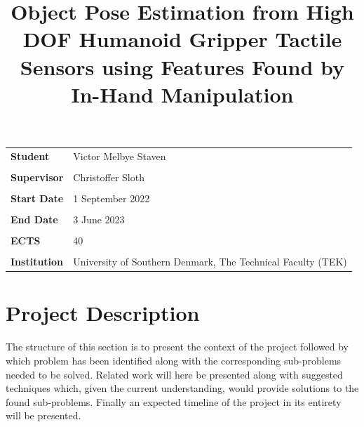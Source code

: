 \documentclass{article}
\title{Object Pose Estimation from High DOF Humanoid Gripper Tactile Sensors using Features Found by In-Hand Manipulation}
\author{\vspace{-1cm}}
\date{\vspace{-1cm}}
\begin{document}
\maketitle

\begin{flushleft}
\begin{tabular}{@{} p{} p{} @{}} 
 \textbf{Student}     & Victor Melbye Staven \\ \\
 \textbf{Supervisor}  & Christoffer Sloth \\ \\
 \textbf{Start Date}  & 1 September 2022 \\ \\
 \textbf{End Date}    & 3 June 2023 \\ \\
 \textbf{ECTS}        & 40 \\ \\
 \textbf{Institution} & University of Southern Denmark, The Technical Faculty (TEK)
\end{tabular}
\end{flushleft}

\newpage

\section*{Project Description}
\label{project-description}
The structure of this section is to present the context of the project followed by which problem has been identified along with the corresponding sub-problems needed to be solved. Related work will here be presented along with suggested techniques which, given the current understanding, would provide solutions to the found sub-problems. Finally an expected timeline of the project in its entirety will be presented. 
\end{document}
